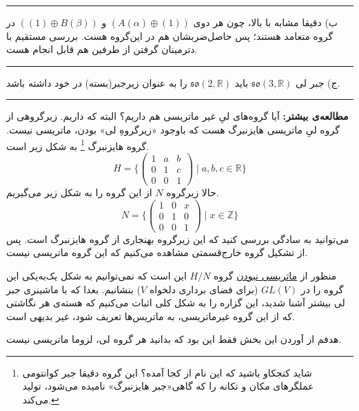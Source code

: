 \documentclass[a4paper, 12pt]{article}
\begin{document}
\par\noindent\rule{\textwidth}{0.6pt}
ب)
دقیقا مشابه با بالا، چون هر دوی 
$(A(\alpha) \oplus (1))$
و 
$((1) \oplus B(\beta))$
در گروه متعامد هستند؛ پس حاصل‌ضربشان هم در این‌گروه هست. بررسی مستقیم با دترمینان گرفتن از طرفین هم قابل انجام هست.

\par\noindent\rule{\textwidth}{0.6pt}
ج)
جبر لی 
 $\mathfrak{so}(3,\mathbb{R})$
 باید 
  $\mathfrak{so}(2,\mathbb{R})$
  را به عنوان زیرجبر(بسته) در خود داشته باشد.

 
















\par\noindent\rule{\textwidth}{2pt}

\vspace{0.8em}
\textbf{مطالعه‌ی بیشتر:}
آیا گروه‌های لیِ غیر ماتریسی هم داریم؟ البته که داریم. زیرگروهی از گروه لیِ ماتریسی هایزنبرگ هست که باوجود «زیرگروهِ لی» بودن، ماتریسی نیست. گروه هایزنبرگ
\footnote{شاید کنجکاو باشید که این نام از کجا آمده؟ این گروه دقیقا جبر کوانتومی عملگرهای مکان و تکانه را که گاهی«جبر هایزنبرگ» نامیده می‌شود، تولید می‌کند.}
به شکل زیر است.
\[
H = \Biggl\{
\begin{pmatrix}
	1 & a & b \\ 0 & 1 & c \\ 0 & 0 & 1
\end{pmatrix}\; | \; a,b,c \in \mathbb{R}
\Biggr\}
\]
حالا زیرگروه $N$ از این گروه را به شکل زیر می‌گیریم.
\[
N = \Biggl\{
\begin{pmatrix}
	1 & 0 & x \\ 0 & 1 & 0 \\ 0 & 0 & 1
\end{pmatrix}\; | \; x \in \mathbb{Z}
\Biggr\}
\]
می‌توانید به سادگی بررسی کنید که این زیرگروه بهنجاری از گروه هایزنبرگ است. پس از تشکیل گروه خارج‌قسمتی مشاهده می‌کنیم که این گروه ماتریسی نیست. 

منظور از \underline{ماتریسی نبودن} گروه 
$H/N$
این است که نمی‌توانیم به شکل یک‌به‌یکی این گروه را در 
$GL(V)$
(برای فضای برداری دلخواه $V$) بنشانیم. بعدا که با ماشینری جبر لی بیشتر آشنا شدید، این گزاره را به شکل کلی اثبات می‌کنیم که هسته‌ی هر نگاشتی که از این گروه غیر‌ماتریسی، به ماتریس‌ها تعریف شود، غیر بدیهی است.

هدفم از آوردن این بخش فقط این بود که بدانید هر گروه‌ لی، لزوما ماتریسی نیست.
\end{document}
